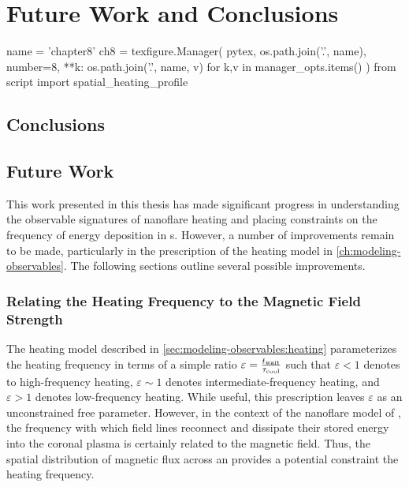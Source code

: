 \chapter{Future Work and Conclusions}\label{ch:conclusions}

\begin{pycode}[chapter8]
name = 'chapter8'
ch8 = texfigure.Manager(
    pytex,
    os.path.join('.', name),
    number=8,
    **{k: os.path.join('.', name, v) for k,v in manager_opts.items()}
)
from script import spatial_heating_profile
\end{pycode}

\section{Conclusions}\label{sec:conclusions}


\section{Future Work}\label{sec:future-work}


This work presented in this thesis has made significant progress in understanding the observable signatures of nanoflare heating and placing constraints on the frequency of energy deposition in \AR s. However, a number of improvements remain to be made, particularly in the prescription of the heating model in \autoref{ch:modeling-observables}. The following sections outline several possible improvements.

\subsection{Relating the Heating Frequency to the Magnetic Field Strength}\label{sec:bundle}

The heating model described in \autoref{sec:modeling-observables:heating} parameterizes the heating frequency in terms of a simple ratio $\varepsilon=\frac{t_{\textup{wait}}}{\tau_\textup{cool}}$ such that $\varepsilon<1$ denotes to high-frequency heating, $\varepsilon\sim1$ denotes intermediate-frequency heating, and $\varepsilon>1$ denotes low-frequency heating. While useful, this prescription leaves $\varepsilon$ as an unconstrained free parameter. However, in the context of the nanoflare model of \citet[see \autoref{sec:nanoflares}]{parker_nanoflares_1988}, the frequency with which field lines reconnect and dissipate their stored energy into the coronal plasma is certainly related to the magnetic field. Thus, the spatial distribution of magnetic flux across an \AR{} provides a potential constraint the heating frequency.

